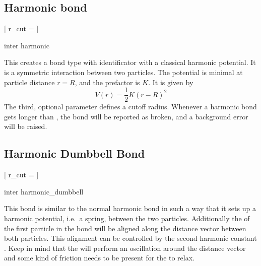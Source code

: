 \subsection{Harmonic bond}

\begin{pysyntax}
  [
    r_cut = 
  ]
\end{pysyntax}

\begin{essyntax}
  inter 
  harmonic   
\end{essyntax}
This creates a bond type with identificator  with a
classical harmonic potential. It is a symmetric interaction between two
particles. The potential is minimal at particle distance $r=R$, and the
prefactor is $K$. It is given by
\begin{equation}
  V(r) = \frac{1}{2} K \left( r - R \right)^2
\end{equation}
The third, optional parameter  defines a cutoff
radius.  Whenever a harmonic bond gets longer than
, the bond will be reported as broken, and a
background error will be raised.

\subsection{Harmonic Dumbbell Bond}

\begin{pysyntax}
  [
    r_cut = 
  ]
\end{pysyntax}

\begin{essyntax}
  inter 
  harmonic_dumbbell    
  \begin{features}
  \end{features}
\end{essyntax}
This bond is similar to the normal harmonic bond in such a way that it
sets up a harmonic potential, i.e.\ a spring, between the two
particles.  Additionally the  of the first particle in
the bond will be aligned along the distance vector between both
particles.  This alignment can be controlled by the second harmonic
constant .  Keep in mind that the  will perform
an oscillation around the distance vector and some kind of friction
needs to be present for the  to relax.

